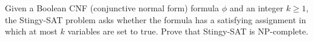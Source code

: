 \problem{}

Given a Boolean CNF (conjunctive normal form) formula $\phi$ and an integer $k \geq 1$, the Stingy-SAT problem asks whether the formula has a satisfying assignment in which at most $k$ variables are set to true. Prove that Stingy-SAT is NP-complete.

\solution{}






\newpage